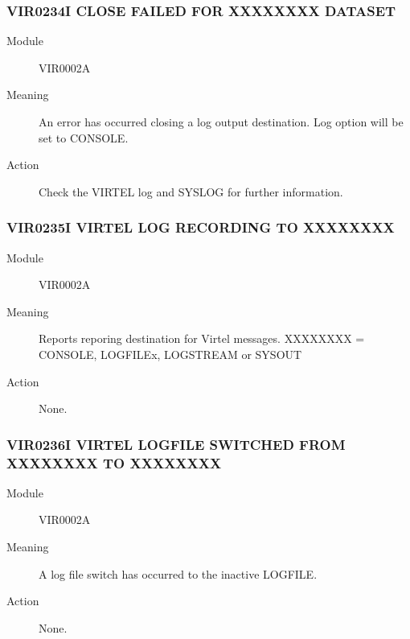 \documentclass[letterpaper,10pt,english]{sphinxmanual}
\begin{document}
\subsubsection{VIR0234I CLOSE FAILED FOR XXXXXXXX DATASET}
\label{\detokenize{messages:vir0234i-close-failed-for-xxxxxxxx-dataset}}\begin{description}
\item[{Module}] \leavevmode
VIR0002A

\item[{Meaning}] \leavevmode
An error has occurred closing a log output destination. Log option will be set to CONSOLE.

\item[{Action}] \leavevmode
Check the VIRTEL log and SYSLOG for further information.

\end{description}


\subsubsection{VIR0235I VIRTEL LOG RECORDING TO XXXXXXXX}
\label{\detokenize{messages:vir0235i-virtel-log-recording-to-xxxxxxxx}}\begin{description}
\item[{Module}] \leavevmode
VIR0002A

\item[{Meaning}] \leavevmode
Reports reporing destination for Virtel messages. XXXXXXXX = CONSOLE, LOGFILEx, LOGSTREAM or SYSOUT

\item[{Action}] \leavevmode
None.

\end{description}


\subsubsection{VIR0236I VIRTEL LOGFILE SWITCHED FROM XXXXXXXX TO XXXXXXXX}
\label{\detokenize{messages:vir0236i-virtel-logfile-switched-from-xxxxxxxx-to-xxxxxxxx}}\begin{description}
\item[{Module}] \leavevmode
VIR0002A

\item[{Meaning}] \leavevmode
A log file switch has occurred to the inactive LOGFILE.

\item[{Action}] \leavevmode
None.

\end{description}
\end{document}
